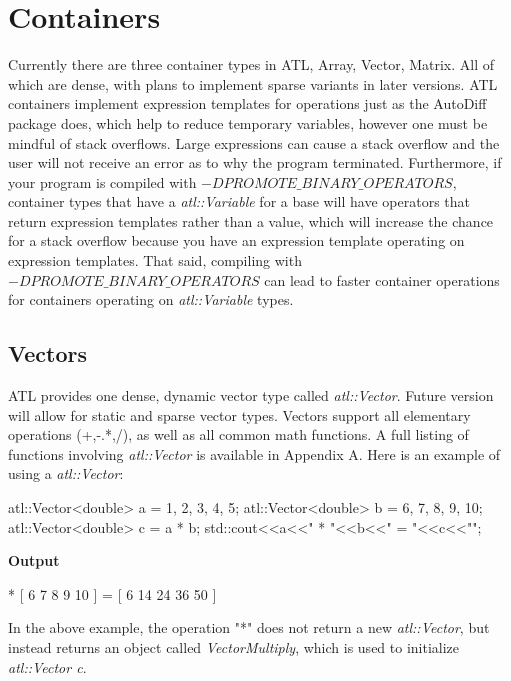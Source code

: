 \documentclass[12pt,a4paper]{article}
\begin{document}
\section{Containers}
Currently there are three container types in ATL, Array, Vector, Matrix. All of which are dense, with plans to implement sparse variants in later versions. ATL containers implement expression templates for operations just as the AutoDiff package does, which help to reduce temporary variables, however one must be mindful of stack overflows. Large expressions can cause a stack overflow and the user will not receive an error as to why the program terminated. Furthermore, if your program is compiled with \textit{$-DPROMOTE\_BINARY\_OPERATORS$}, container types that have a \textit{atl::Variable} for a base will have operators that return expression templates rather than a value, which will increase the chance for a stack overflow because you have an expression template operating on expression templates. That said, compiling with \textit{$-DPROMOTE\_BINARY\_OPERATORS$} can lead to faster container operations for containers operating on \textit{atl::Variable} types.
\subsection{Vectors}
ATL provides one dense, dynamic vector type called \textit{atl::Vector}. Future version will allow for static and sparse vector types. Vectors support all elementary operations (+,-.*,/), as well as all common math functions. A full listing of functions involving \textit{atl::Vector} is available in Appendix A. Here is an example of using a \textit{atl::Vector}:
\begin{cppsource}

    atl::Vector<double> a = {1, 2, 3, 4, 5};
    atl::Vector<double> b = {6, 7, 8, 9, 10};
    atl::Vector<double> c = a * b;
    std::cout<<a<<" * "<<b<<" = "<<c<<"\n";
  
\end{cppsource}
\textbf{Output}
\begin{myoutput}
[ 1 2 3 4 5 ] * [ 6 7 8 9 10 ] = [ 6 14 24 36 50 ]
\end{myoutput}
In the above example, the operation "*" does not return a new \textit{atl::Vector}, but instead returns an object called \textit{VectorMultiply}, which is used to initialize \textit{atl::Vector c}.
\end{document}
